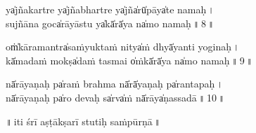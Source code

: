 \documentclass[parskip, DIV=18]{scrartcl}
\begin{document}
\vspace{0.3cm}

\noindent ya̍jñakartre ya̍jñabha॒rtre ya̍jña̍rū̍pāya̍te na॒ma॒ḥ॒\,। \\
su॑jñāna goca̍rāyā॒stu ya̍kā̍rā̍ya na̍mo na॒ma॒ḥ॒\,॥\,8\,॥ 

\vspace{0.3cm}

\noindent oṁ̍kāramantra̍saṁyu॒ktaṁ ni॑tya̍ṁ dhyā̍yanti॑ yogi॒na॒ḥ॒\,। \\
kā̍madaṁ mokṣa̍daṁ ta॒smai o̍ṁkā̍rā̍ya na̍mo na॒ma॒ḥ॒\,॥\,9\,॥ 

\vspace{0.3cm}

\noindent nā̍rāyaṇaḥ pa̍raṁ bra॒hma nā̍rā̍yaṇaḥ pa̍ranta॒pa॒ḥ॒\,। \\
nā̍rāyaṇaḥ pa̍ro de॒vaḥ sa̍rva̍ṁ nā̍rāya̍ṇassa॒dā॒\,॥\,10\,॥ 
 
\vspace{0.3cm}
 
\begin{center}
 ॥\,iti śrī a॒ṣṭākṣarī stu॒ti॒ḥ saṁpū॒rṇā\,॥
\end{center}

\vspace{1.5cm}
\end{document}

